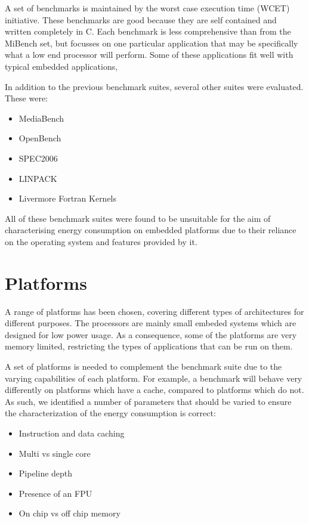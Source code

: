 \documentclass[twocolumn]{article}
\begin{document}
A set of benchmarks is maintained by the worst case execution time (WCET) initiative\cite{Gustafsson2010}. These benchmarks are good because they are self contained and written completely in C. Each benchmark is less comprehensive than from the MiBench set, but focusses on one particular application that may be specifically what a low end processor will perform. Some of these applications fit well with typical embedded applications,

In addition to the previous benchmark suites, several other suites were evaluated. These were:
\begin{itemize}
	\setlength{\itemsep}{-0.25em}
	\item MediaBench
	\item OpenBench\cite{OpenBench}
	\item SPEC2006\cite{Henning2006}
	\item LINPACK
	\item Livermore Fortran Kernels
\end{itemize}

All of these benchmark suites were found to be unsuitable for the aim of characterising energy consumption on embedded platforms due to their reliance on the operating system and features provided by it.

\section{Platforms}

A range of platforms has been chosen, covering different types of architectures for different purposes. The processors are mainly small embeded systems which are designed for low power usage. As a consequence, some of the platforms are very memory limited, restricting the types of applications that can be run on them.

A set of platforms is needed to complement the benchmark suite due to the varying capabilities of each platform. For example, a benchmark will behave very differently on platforms which have a cache, compared to platforms which do not. As such, we identified a number of parameters that should be varied to ensure the characterization of the energy consumption is correct:

\begin{itemize}
	\setlength{\itemsep}{-0.25em}
	\item Instruction and data caching
	\item Multi vs single core
	\item Pipeline depth
	\item Presence of an FPU
	\item On chip vs off chip memory
\end{itemize}
\end{document}
